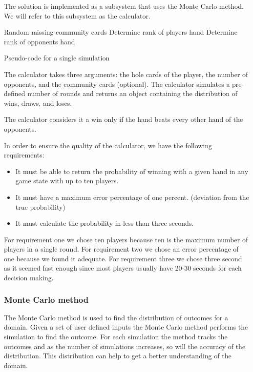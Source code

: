 The solution is implemented as a subsystem that uses the Monte Carlo method. We will refer to this subsystem as the calculator.

\LinesNumbered
\vspace{4mm}
\begin{algorithm}[H]
Random missing community cards\;
Determine rank of players hand\;
   {
    Determine rank of opponents hand\;
  }
  \;
\caption{Pseudo-code for a single simulation}
\end{algorithm}
\vspace{4mm}

The calculator takes three arguments: the hole cards of the player, the number of opponents, and the community cards (optional). The calculator simulates a pre-defined number of rounds and returns an object containing the distribution of wins, draws, and loses.

The calculator considers it a win only if the hand beats every other hand of the opponents.

In order to ensure the quality of the calculator, we have the following requirements:
\begin{itemize}
\item It must be able to return the probability of winning with a given hand in any game state with up to ten players.
\item It must have a maximum error percentage of one percent. (deviation from the true probability)
\item It must calculate the probability in less than three seconds.
\end{itemize}

For requirement one we chose ten players because ten is the maximum number of players in a single round.
For requirement two we chose an error percentage of one because we found it adequate.
For requirement three we chose three second as it seemed fast enough since most players usually have 20-30 seconds for each decision making.

\subsubsection{Monte Carlo method}
The Monte Carlo method is used to find the distribution of outcomes for a domain. Given a set of user defined inputs the Monte Carlo method performs the simulation to find the outcome. For each simulation the method tracks the outcomes and as the number of simulations increases, so will the accuracy of the distribution. This distribution can help to get a better understanding of the domain.

